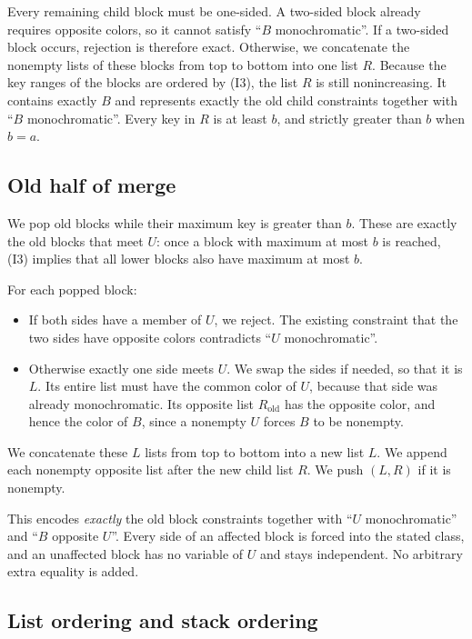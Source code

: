 \documentclass[11pt]{article}
\begin{document}
Every remaining child block must be one-sided. A two-sided block already
requires opposite colors, so it cannot satisfy ``$B$ monochromatic''. If a
two-sided block occurs, rejection is therefore exact. Otherwise, we concatenate
the nonempty lists of these blocks from top to bottom into one list $R$.
Because the key ranges of the blocks are ordered by (I3), the list $R$ is still
nonincreasing. It contains exactly $B$ and represents exactly the old child
constraints together with ``$B$ monochromatic''. Every key in $R$ is at least
$b$, and strictly greater than $b$ when $b=a$.

\subsection*{Old half of merge}

We pop old blocks while their maximum key is greater than $b$. These are
exactly the old blocks that meet $U$: once a block with maximum at most $b$ is
reached, (I3) implies that all lower blocks also have maximum at most $b$.

For each popped block:
\begin{itemize}[nosep]
\item If both sides have a member of $U$, we reject. The existing constraint
that the two sides have opposite colors contradicts ``$U$ monochromatic''.
\item Otherwise exactly one side meets $U$. We swap the sides if needed, so that
it is $L$. Its entire list must have the common color of $U$, because that side
was already monochromatic. Its opposite list $R_{\mathrm{old}}$ has the
opposite color, and hence the color of $B$, since a nonempty $U$ forces $B$ to
be nonempty.
\end{itemize}
We concatenate these $L$ lists from top to bottom into a new list $L$. We
append each nonempty opposite list after the new child list $R$. We push
$(L,R)$ if it is nonempty.

This encodes \emph{exactly} the old block constraints together with ``$U$
monochromatic'' and ``$B$ opposite $U$''. Every side of an affected block is
forced into the stated class, and an unaffected block has no variable of $U$
and stays independent. No arbitrary extra equality is added.

\subsection*{List ordering and stack ordering}
\end{document}
